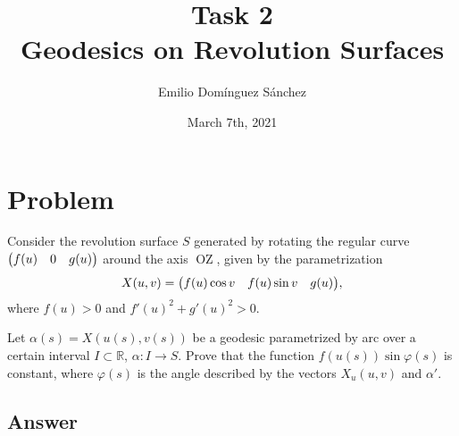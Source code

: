 \documentclass[
    12pt, %
]{fphw}
\title{Task 2 \\ Geodesics on Revolution Surfaces} %
\author{Emilio Domínguez Sánchez} %
\date{March 7th, 2021} %
\institute{University of Murcia \\ Faculty of Mathematics} %
\newcommand{\R}{\mathbb{R}}
\begin{document}
\maketitle %


\section*{Problem}

\begin{problem}
    Consider the revolution surface $S$ generated by rotating
    the regular curve $\mqty(f(u) & 0 & g(u))$
    around the axis $\operatorname{OZ}$,
    given by the parametrization
    \begin{equation*}
        X(u, v) = \mqty(f(u)\cos v & f(u)\sin v & g(u)),
    \end{equation*}
    where $f(u) > 0$ and $f'(u)^2 + g'(u)^2 > 0$.

    Let $α(s) = X(u(s), v(s))$ be a geodesic parametrized by arc
    over a certain interval $I \subset \R$, $α : I \to S$.
    Prove that the function $f(u(s))\sin φ(s)$ is constant,
    where $φ(s)$ is the angle described by the vectors $X_u(u, v)$ and $α'$.
\end{problem}


\subsection*{Answer}
\end{document}
